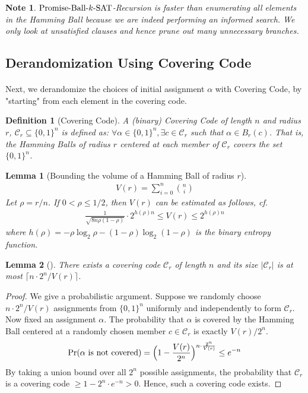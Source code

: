 \documentclass[a4paper,12pts]{article}
\newcommand{\SAT}{\textnormal{$k$-SAT}}
\newcommand{\ball}[2]{B_{#1}(#2)}
\newcommand{\PBS}{\textnormal{Promise-Ball-$\SAT$}}
\newcommand{\cc}{\mathcal{C}}
\newcommand{\bits}{\{0,1\}}
\renewcommand{\Pr}{\textnormal{Pr}}
\newtheorem{definition}{Definition}
\newtheorem*{note}{Note}
\newtheorem{lemma}{Lemma}
\begin{document}
\begin{note}
	$\PBS$-Recursion is faster than enumerating all elements in the Hamming Ball because we are indeed performing an informed search. We only look at unsatisfied clauses and hence prune out many unnecessary branches.
\end{note}
\subsection{Derandomization Using Covering Code}
\paragraph{} Next, we derandomize the choices of initial assignment $\alpha$ with Covering Code, by "starting" from each element in the covering code. \par 
\begin{definition}[Covering Code]
	A (binary) Covering Code of length $n$ and radius $r$, $\cc_r \subseteq \bits^n$ is defined as: $\forall \alpha \in \bits^n, \exists c \in \cc_r$ such that $\alpha \in \ball{r}{c}$. That is, the Hamming Balls of radius $r$ centered at each member of $\cc_r$ covers the set $\bits^n$.
\end{definition}
\begin{lemma}[Bounding the volume of a Hamming Ball of radius $r$\cite{Dantsin02}]
	\begin{align*}
	V(r) = \sum_{i = 0}^{n} {n \choose i}
	\end{align*}
	Let $\rho = r/n$. If $0 < \rho \leq 1/2$, then $V(r)$ can be estimated as follows, cf. \cite[Lemma 2.4.4]{Cohen97} 
	\begin{align*}
	\frac{1}{\sqrt{8n\rho(1-\rho)}} \cdot 2^{h(\rho)n} \leq V(r) \leq 2^{h(\rho)n}
	\end{align*}
	where $h(\rho) = -\rho \log_2 \rho - (1-\rho)\log_2(1-\rho)$ is the binary entropy function.
\end{lemma}
\begin{lemma}[\cite{Dantsin02}]
	There exists a covering code $\cc_r$ of length $n$ and its size $|\cc_r|$ is at most $\lceil n\cdot 2^n / V(r) \rceil$.
\end{lemma}
\begin{proof}
	We give a probabilistic argument. Suppose we randomly choose $ n\cdot 2^n / V(r)$ assignments from $\bits^n$ uniformly and independently to form $\cc_r$. Now fixed an assignment $\alpha$. The probability that $\alpha$ is covered by the Hamming Ball centered at a randomly chosen member $c \in \cc_r$ is exactly $V(r)/2^n$. 
	\begin{align*}
	\Pr(\text{$\alpha$ is not covered}) = \Big(1-\frac{V(r)}{2^n}\Big)^{n\cdot \frac{2^n}{V(r)}} \leq e^{-n}
	\end{align*}
	By taking a union bound over all $2^n$ possible assignments, the probability that $\cc_r$ is a covering code $\geq 1 - 2^n\cdot e^{-n} > 0$. Hence, such a covering code exists. 
\end{proof}
\end{document}

